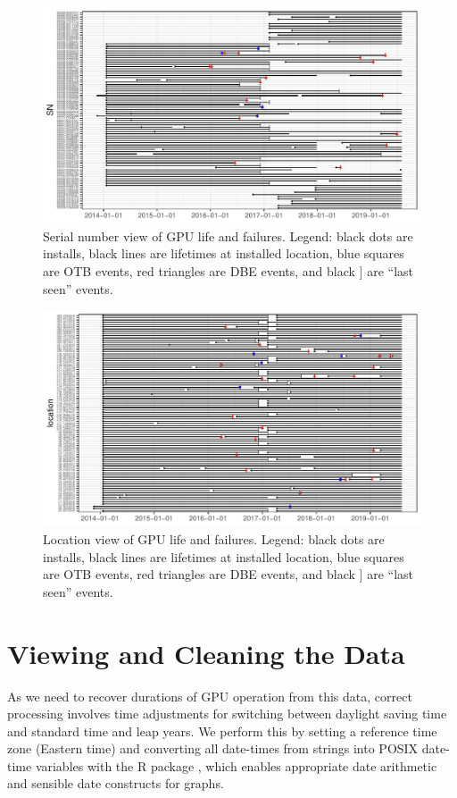 \begin{figure}[bt]
  \includegraphics[trim=0 7 0 5,clip,width=6.5in]{figs/sample_sn.pdf}
  \caption{Serial number view of GPU life and failures. Legend: black
    dots are installs, black lines are lifetimes at installed
    location, blue squares are OTB events, red triangles are DBE
    events, and black ] are ``last seen'' events.}
  \label{fig:gpuview}
\end{figure}
\begin{figure}[tb]
  \includegraphics[trim=0 7 0 5,clip,width=6.5in]{figs/sample_loc.pdf}
  \caption{Location view of GPU life and failures.  Legend: black dots
    are installs, black lines are lifetimes at installed location,
    blue squares are OTB events, red triangles are DBE events, and
    black ] are ``last seen'' events.}
  \label{fig:locview}
\end{figure}
\section{Viewing and Cleaning the Data}
\label{section:dataclean}
As we need to recover durations of GPU operation from this data, correct
processing involves time adjustments for switching between daylight
saving time and standard time and leap years. We perform this by
setting a reference time zone (Eastern time) and converting all
date-times from strings into POSIX date-time variables with the R
 package \cite{lubridate}, which enables appropriate
date arithmetic and sensible date constructs for graphs.

